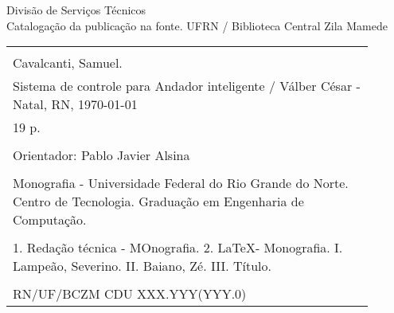 %
%

\newpage

\begin{center}

\vspace*{\fill}

Divisão de Serviços Técnicos\\[1ex]
Catalogação da publicação na fonte.
UFRN / Biblioteca Central Zila Mamede

\vspace{2ex}

\begin{tabular}{|p{0.9\linewidth}|} \hline
\\ Cavalcanti, Samuel.\\
\hspace{1em} Sistema de controle para Andador inteligente /
Válber César - Natal, RN, \today \\
\hspace{1em} 19 p. \\
\\
\hspace{1em} Orientador: Pablo Javier Alsina \\
\\
\hspace{1em} Monografia - Universidade Federal do Rio Grande do Norte.
Centro de Tecnologia. Graduação em Engenharia de Computação. \\
\\
\hspace{1em} 1. Redação técnica - MOnografia. 2. \LaTeX - Monografia. 
I. Lampeão, Severino. II. Baiano, Zé.
III. Título. \\
\\
RN/UF/BCZM \hfill CDU XXX.YYY(YYY.0) \\ \hline
\end{tabular} 

\end{center}
